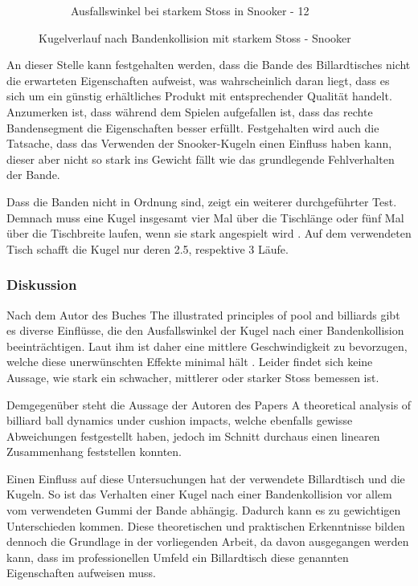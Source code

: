 \begin{figure}[h!]
\begin{subfigure}[t]{0.2\textwidth}
        \caption{Ausfallswinkel bei starkem Stoss in Snooker - 12}
        \label{fig:rebound_angle_fast_snooker_12}
    \end{subfigure}
    \caption{Kugelverlauf nach Bandenkollision mit starkem Stoss - Snooker}
    \label{fig:kugelverlauf_nach_bandenkollision_mit_starkem_stoss_snooker}
\end{figure}

\newpage
An dieser Stelle kann festgehalten werden, dass die Bande des Billardtisches nicht die erwarteten Eigenschaften
aufweist, was wahrscheinlich daran liegt, dass es sich um ein günstig erhältliches Produkt mit entsprechender Qualität handelt.
Anzumerken ist, dass während dem Spielen aufgefallen ist, dass das rechte Bandensegment die
Eigenschaften besser erfüllt. Festgehalten wird auch die Tatsache, dass das Verwenden der Snooker-Kugeln einen
Einfluss haben kann, dieser aber nicht so stark ins Gewicht fällt wie das grundlegende Fehlverhalten
der Bande.

Dass die Banden nicht in Ordnung sind, zeigt ein weiterer durchgeführter Test. Demnach muss eine Kugel insgesamt vier Mal über
die Tischlänge oder fünf Mal über die Tischbreite laufen, wenn sie stark angespielt wird \cite{sport64:bandengummi}.
Auf dem verwendeten Tisch schafft die Kugel nur deren 2.5, respektive 3 Läufe.

\newpage
\subsubsection{Diskussion}
Nach dem Autor des Buches \glqq The illustrated principles of pool and billiards\grqq{} gibt es diverse Einflüsse,
die den Ausfallswinkel der Kugel nach einer Bandenkollision beeinträchtigen. Laut ihm ist daher eine mittlere
Geschwindigkeit zu bevorzugen, welche diese unerwünschten Effekte minimal hält \cite{book:the_ilustrated_principles_of_pool_and_billiards}.
Leider findet sich keine Aussage, wie stark ein schwacher, mittlerer oder starker Stoss bemessen ist.

Demgegenüber steht die Aussage der Autoren des Papers \glqq A theoretical analysis of billiard ball dynamics under cushion impacts\grqq \cite{10.1243/09544062JMES1964}, welche ebenfalls
gewisse Abweichungen festgestellt haben, jedoch im Schnitt durchaus einen linearen Zusammenhang feststellen konnten.

Einen Einfluss auf diese Untersuchungen hat der verwendete Billardtisch und die Kugeln.
So ist das Verhalten einer Kugel nach einer Bandenkollision vor allem vom verwendeten Gummi der
Bande abhängig. Dadurch kann es zu gewichtigen Unterschieden kommen.
Diese theoretischen und praktischen Erkenntnisse bilden dennoch die Grundlage in der vorliegenden Arbeit,
da davon ausgegangen werden kann, dass im professionellen  Umfeld ein Billardtisch diese genannten Eigenschaften aufweisen muss.

